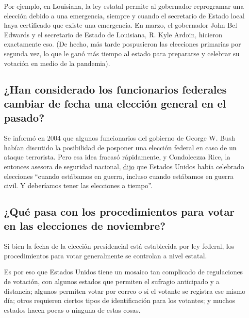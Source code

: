 Por ejemplo, en Louisiana, la ley estatal permite al gobernador
reprogramar una elección debido a una emergencia, siempre y cuando el
secretario de Estado local haya certificado que existe una emergencia.
En marzo, el gobernador John Bel Edwards y el secretario de Estado de
Louisiana, R. Kyle Ardoin, hicieron exactamente eso. (De hecho, más
tarde pospusieron las elecciones primarias por segunda vez, lo que le
ganó más tiempo al estado para prepararse y celebrar su votación en
medio de la pandemia).

\hypertarget{han-considerado-los-funcionarios-federales-cambiar-de-fecha-una-elecciuxf3n-general-en-el-pasado}{%
\subsection{¿Han considerado los funcionarios federales cambiar de fecha
una elección general en el
pasado?}\label{han-considerado-los-funcionarios-federales-cambiar-de-fecha-una-elecciuxf3n-general-en-el-pasado}}

Se informó en 2004 que algunos funcionarios del gobierno de George W.
Bush habían discutido la posibilidad de posponer una elección federal en
caso de un ataque terrorista. Pero esa idea fracasó rápidamente, y
Condoleezza Rice, la entonces asesora de seguridad nacional,
\href{https://www.nytimes.com/2004/07/13/trail/trail/white-house-tries-to-calm-hubbub-over-vote-delay.html}{dijo}
que Estados Unidos había celebrado elecciones ``cuando estábamos en
guerra, incluso cuando estábamos en guerra civil. Y deberíamos tener las
elecciones a tiempo''.

\hypertarget{quuxe9-pasa-con-los-procedimientos-para-votar-en-las-elecciones-de-noviembre}{%
\subsection{¿Qué pasa con los procedimientos para votar en las
elecciones de
noviembre?}\label{quuxe9-pasa-con-los-procedimientos-para-votar-en-las-elecciones-de-noviembre}}

Si bien la fecha de la elección presidencial está establecida por ley
federal, los procedimientos para votar generalmente se controlan a nivel
estatal.

Es por eso que Estados Unidos tiene un mosaico tan complicado de
regulaciones de votación, con algunos estados que permiten el sufragio
anticipado y a distancia; algunos permiten votar por correo o si el
votante se registra ese mismo día; otros requieren ciertos tipos de
identificación para los votantes; y muchos estados hacen pocas o ninguna
de estas cosas.

